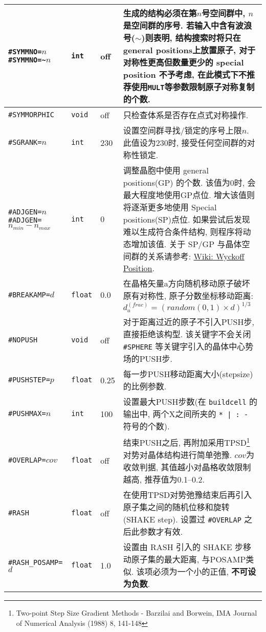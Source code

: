 \documentclass[a4paper, 10pt]{article}
\begin{document}
\begin{center}
\begin{longtable}{m{11em}|m{4em}<{\centering}|m{3em}<{\centering}|m{15em}}
\verb|#SYMMNO=|\(n\)\hspace{6em} \verb|#SYMMNO=~|\(n\) & \verb|int| & off & 生成的结构必须在第\(n\)号空间群中, \(n\)是空间群的序号. 若输入中含有波浪号(\(\sim\))则表明, 结构搜索时将只在general positions上放置原子, 对于对称性更高但数量更少的 special position 不予考虑, 在此模式下不推荐使用\verb|MULT|等参数限制原子对称复制的个数.\\
\midrule
\verb|#SYMMORPHIC| & \verb|void| & off & 只检查体系是否存在点式对称操作.\\
\midrule
\verb|#SGRANK=|\(n\) & \verb|int| & 230 & 设置空间群寻找/锁定的序号上限\(n\). 此值设为230时, 接受任何空间群的对称性锁定.\\
\midrule
\verb|#ADJGEN=|\(n\)\hspace{4em}\verb|#ADJGEN=|\(n_{min}-n_{max}\)  & \verb|int|  & 0 & 调整晶胞中使用 general positions(GP) 的个数. 该值为0时, 会最大程度地使用GP点位. 增大该值则将逐渐更多地使用 Special positions(SP)点位. 如果尝试后发现难以生成符合条件结构, 则程序将动态增加该值. 关于 SP/GP 与晶体空间群的关系请参考: \href{https://en.wikipedia.org/wiki/Wyckoff_positions}{Wiki: Wyckoff Position}.\\
\midrule
\verb|#BREAKAMP=|\(d\) & \verb|float| & 0.0 & 在晶格矢量a方向随机移动原子破坏原有对称性, 原子分数坐标移动距离: \(d^{(frac)}_a=(random(0,1)\times{}d)^{1/3}\)\\
\midrule
\verb|#NOPUSH|& \verb|void| & off & 对于距离过近的原子不引入PUSH步, 直接拒绝该构型. 该关键字不会关闭 \verb|#SPHERE| 等关键字引入的晶体中心势场的PUSH步.\\
\midrule
\verb|#PUSHSTEP=|\(p\)& \verb|float| & 0.25 & 每一步PUSH移动距离大小(stepsize)的比例参数.\\
\midrule
\verb|#PUSHMAX=|\(n\)& \verb|int| & 100 &设置最大PUSH步数(在 \verb|buildcell| 的输出中, 两个X之间所夹的 \verb!* | : -! 符号的个数).\\
\midrule
\verb|#OVERLAP=|\(cov\)& \verb|float| & off & 结束PUSH之后, 再附加采用TPSD\footnote{Two-point Step Size Gradient Methods - Barzilai and Borwein, IMA Journal of Numerical Analysis (1988) 8, 141-148}对势对晶体结构进行简单弛豫. \(cov\)为收敛判据, 其值越小对晶格收敛限制越高, 推荐值为0.1--0.2.\\
\midrule
\verb|#RASH|& \verb|float| & off & 在使用TPSD对势弛豫结束后再引入原子集之间的随机位移和旋转(SHAKE step). 设置过 \verb|#OVERLAP| 之后此参数才有效.\\
\midrule
\verb|#RASH_POSAMP=|\(d\)& \verb|float| & 1.0 & 设置由 RASH 引入的 SHAKE 步移动原子集的最大距离, 与POSAMP类似. 该项必须为一个小的正值, \textbf{不可设为负数}.\\

\end{longtable}
\end{center}
\end{document}
